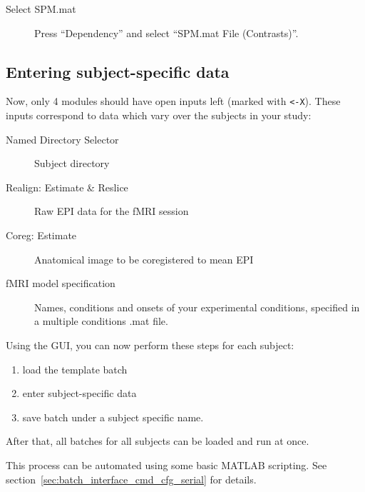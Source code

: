 \begin{description}
\item[Select SPM.mat] Press ``Dependency'' and select ``SPM.mat File
  (Contrasts)''. 
\end{description}

\subsection{Entering subject-specific data}

Now, only 4 modules should have open inputs left (marked with \verb|<-X|). These
inputs correspond to data which vary over the subjects in your study:
\begin{description}
\item[Named Directory Selector] Subject directory
\item[Realign: Estimate \& Reslice] Raw EPI data for the fMRI session
\item[Coreg: Estimate] Anatomical image to be coregistered to mean EPI
\item[fMRI model specification] Names, conditions and onsets of your
  experimental conditions, specified in a multiple conditions .mat file.
\end{description}

Using the GUI, you can now perform these steps for each subject:
\begin{enumerate}
\item load the template batch
\item enter subject-specific data
\item save batch under a subject specific name.
\end{enumerate}

After that, all batches for all subjects can be loaded and run at once.

This process can be automated using some basic MATLAB scripting. See
section~\ref{sec:batch_interface_cmd_cfg_serial} for details.

